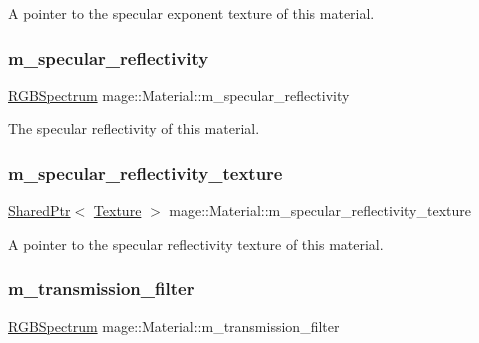 A pointer to the specular exponent texture of this material. \hypertarget{structmage_1_1_material_a45587388f4ff57c209de2280b71af9d3}{}\label{structmage_1_1_material_a45587388f4ff57c209de2280b71af9d3} 
\subsubsection{\texorpdfstring{m\+\_\+specular\+\_\+reflectivity}{m\_specular\_reflectivity}}
{\footnotesize\ttfamily \hyperlink{structmage_1_1_r_g_b_spectrum}{R\+G\+B\+Spectrum} mage\+::\+Material\+::m\+\_\+specular\+\_\+reflectivity\hspace{0.3cm}{\ttfamily [private]}}

The specular reflectivity of this material. \hypertarget{structmage_1_1_material_ac925df9d71f8668c03e8efada632b300}{}\label{structmage_1_1_material_ac925df9d71f8668c03e8efada632b300} 
\subsubsection{\texorpdfstring{m\+\_\+specular\+\_\+reflectivity\+\_\+texture}{m\_specular\_reflectivity\_texture}}
{\footnotesize\ttfamily \hyperlink{namespacemage_a1e01ae66713838a7a67d30e44c67703e}{Shared\+Ptr}$<$ \hyperlink{classmage_1_1_texture}{Texture} $>$ mage\+::\+Material\+::m\+\_\+specular\+\_\+reflectivity\+\_\+texture\hspace{0.3cm}{\ttfamily [private]}}

A pointer to the specular reflectivity texture of this material. \hypertarget{structmage_1_1_material_a9573a0d2a5fb0322f9eb103ace34dd47}{}\label{structmage_1_1_material_a9573a0d2a5fb0322f9eb103ace34dd47} 
\subsubsection{\texorpdfstring{m\+\_\+transmission\+\_\+filter}{m\_transmission\_filter}}
{\footnotesize\ttfamily \hyperlink{structmage_1_1_r_g_b_spectrum}{R\+G\+B\+Spectrum} mage\+::\+Material\+::m\+\_\+transmission\+\_\+filter\hspace{0.3cm}{\ttfamily [private]}}

